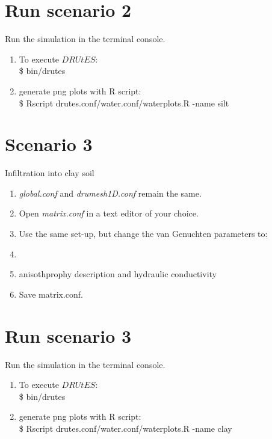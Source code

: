 \documentclass[
10pt, %
a4paper, %
oneside, %
headinclude,footinclude, %
BCOR5mm, %
]{scrartcl}
\begin{document}
\section*{Run scenario 2}
Run the simulation in the terminal console.
\begin{enumerate}
\item To execute $DRUtES$: \\
\$ bin/drutes
\item generate png plots with R script: \\
\$ Rscript drutes.conf/water.conf/waterplots.R -name silt
\end{enumerate}

\section*{Scenario 3}
Infiltration into clay soil
\begin{enumerate}
\item \emph{global.conf} and \emph{drumesh1D.conf} remain the same.
\item Open \emph{matrix.conf} in a text editor of your choice. 
\item Use the same set-up, but change the van Genuchten parameters to:
\item {}
\item anisothprophy description and hydraulic conductivity\\ 
\item Save matrix.conf.
\end{enumerate}

\section*{Run scenario 3}
Run the simulation in the terminal console.
\begin{enumerate}
\item To execute $DRUtES$: \\
\$ bin/drutes
\item generate png plots with R script: \\
\$ Rscript drutes.conf/water.conf/waterplots.R -name clay
\end{enumerate}
\end{document}
